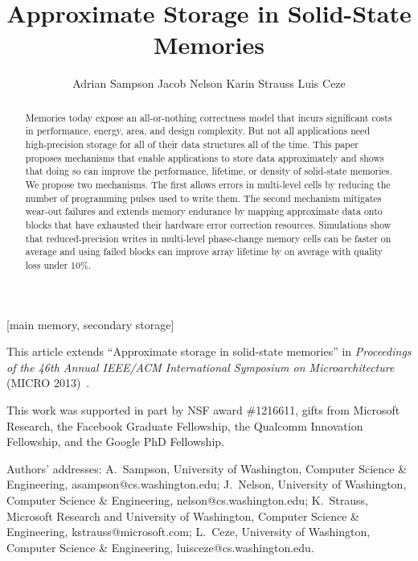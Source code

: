 \documentclass[prodmode,acmtocs]{acmsmall}
\begin{document}
\title{Approximate Storage in Solid-State Memories}
\author{
Adrian Sampson
Jacob Nelson
Karin Strauss
Luis Ceze
}


\begin{abstract}
Memories today expose an all-or-nothing correctness model that
incurs significant costs in performance, energy, area, and design complexity.
But not all applications need high-precision storage for all of their data
structures all of the time.
This paper proposes mechanisms that enable applications to store data approximately
and shows that doing so can improve the performance, lifetime, or density
of solid-state memories. We propose two mechanisms. The
first allows errors in multi-level cells by
reducing the number of programming pulses used to write them.
The second mechanism mitigates
wear-out failures and extends memory endurance by mapping approximate data
onto blocks that have exhausted their
hardware error correction resources.
Simulations show that reduced-precision writes in
multi-level phase-change memory cells can be
 faster on average and using failed blocks can
improve array lifetime by  on average with quality loss under 10\%.
\end{abstract}

[main memory, secondary
storage]




\begin{bottomstuff}
This article extends ``Approximate storage in solid-state memories'' in
\textit{Proceedings of the 46th Annual IEEE/ACM International Symposium on
Microarchitecture} (MICRO 2013)~\cite{approxstorage}.

This work was supported in part by NSF award \#1216611, gifts from Microsoft
Research, the Facebook Graduate Fellowship, the Qualcomm Innovation Fellowship,
and the Google PhD Fellowship.

Authors' addresses:
A.~Sampson, University of Washington, Computer Science \& Engineering,
asampson@cs.washington.edu;
J.~Nelson, University of Washington, Computer Science \& Engineering,
nelson@cs.washington.edu;
K.~Strauss, Microsoft Research and University of Washington, Computer Science \& Engineering,
kstrauss@microsoft.com;
L.~Ceze, University of Washington, Computer Science \& Engineering,
luisceze@cs.washington.edu.
\end{bottomstuff}
\end{document}
